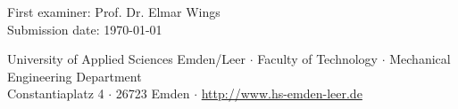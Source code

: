 \begin{titlepage}
\begin{tabbing}
        First examiner: \> Prof. Dr. Elmar Wings \\
        Submission date: \> \today \\
    \end{tabbing}
    
    \vspace{3cm}
    \small
    \begin{center}
        University of Applied Sciences Emden/Leer $\cdot$ 
        Faculty of Technology $\cdot$ 
        Mechanical Engineering Department \\
        Constantiaplatz 4 $\cdot$ 
        26723 Emden $\cdot$ 
        \url{http://www.hs-emden-leer.de}
    \end{center}
    
\end{titlepage}
